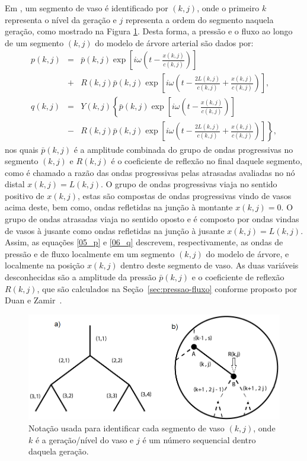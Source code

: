 \documentclass[
        english,			
        brazil			        %
        ,<...>]{abntbibufjf}
\begin{document}
Em \cite{Duan}, um segmento de vaso é identificado por $(k,j)$, onde o primeiro $k$ representa o nível da geração e $j$ representa a ordem do segmento naquela geração, como mostrado na Figura \ref{fig1:arterial-tree}. Desta forma, a pressão e o fluxo ao longo de um segmento  $(k,j)$ do modelo de árvore arterial são dados por:
\begin{eqnarray}
p(k,j) &=& \bar{p}(k,j) \exp\left[i\omega\left(t - \frac{x(k,j)}{c(k,j)}\right)\right] \nonumber \\
&+& R(k,j)  \bar{p}(k,j) \exp\left[i\omega\left(t - \frac{2L(k,j)}{c(k,j)} + \frac{x(k,j)}{c(k,j)}\right)\right],
\label{05_p}\\
q (k,j) &=& Y(k,j)\left\{\bar{p}(k,j) \exp\left[i\omega\left(t - \frac{x(k,j)}{c(k,j)}\right)\right]\right. \nonumber \\
&-& \left. R(k,j)  \bar{p}(k,j) \exp\left[i\omega\left(t - \frac{2L(k,j)}{c(k,j)} + \frac{x(k,j)}{c(k,j)}\right)\right]\right\},
\label{06_q}
\end{eqnarray}
nos quais $\bar{p}(k,j)$ é a amplitude combinada do grupo de ondas progressivas no segmento $(k,j)$ e $R(k,j)$ é o coeficiente de reflexão no final daquele segmento, como é chamado a razão das ondas progressivas pelas atrasadas avaliadas no nó distal $x(k,j) = L(k,j)$. O grupo de ondas progressivas viaja no sentido positivo de $x(k,j)$, estas são compostas de ondas progressivas vindo de vasos acima deste, bem como, ondas refletidas na junção à montante $x(k,j) = 0$. O grupo de ondas atrasadas viaja no sentido oposto e é composto por ondas vindas de vasos à jusante como ondas refletidas na junção à jusante $x(k,j) = L(k,j)$. Assim, as equações \eqref{05_p} e \eqref{06_q} descrevem, respectivamente, as ondas de pressão e de fluxo localmente em um segmento $(k,j)$ do modelo de árvore, e localmente na posição $x(k,j)$ dentro deste segmento de vaso. As duas variáveis desconhecidas são a amplitude da pressão  $\bar{p} (k,j)$ e o coeficiente de reflexão $R (k,j)$, que são calculados na Seção~\ref{sec:pressao-fluxo} conforme proposto por Duan e Zamir~\cite{Duan}.  

\begin{figure}[!htbp] 
	\begin{center}
		\includegraphics[scale = 0.5]{Figures/ArterialTree_Zamir.png}%
		\caption{Notação usada para identificar cada segmento de vaso $(k,j)$, onde $k$ é a geração/nível do vaso e $j$ é um número sequencial dentro daquela geração. }
		\label{fig1:arterial-tree}%
	\end{center}
\end{figure}
\end{document}
